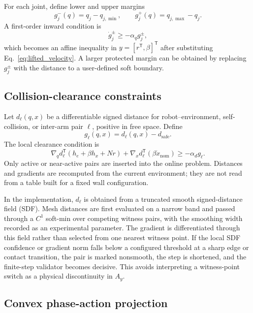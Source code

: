 \documentclass[preprint,12pt]{elsarticle}
\newcommand{\T}{^{\mathsf T}}
\begin{document}
For each joint, define lower and upper margins
\begin{equation}
g_j^-(q)=q_j-q_{j,\min},
\qquad
g_j^+(q)=q_{j,\max}-q_j.
\end{equation}
A first-order inward condition is
\begin{equation}
\dot g_j^{\pm}\geq-\alpha_q g_j^{\pm},
\label{eq:joint_damper}
\end{equation}
which becomes an affine inequality in $y=[r\T,\beta]\T$ after substituting Eq.~\eqref{eq:lifted_velocity}. A larger protected margin can be obtained by replacing $g_j^{\pm}$ with the distance to a user-defined soft boundary.

\subsection{Collision-clearance constraints}

Let $d_\ell(q,x)$ be a differentiable signed distance for robot--environment, self-collision, or inter-arm pair $\ell$, positive in free space. Define
\begin{equation}
g_\ell(q,x)=d_\ell(q,x)-d_{\mathrm{safe}}.
\end{equation}
The local clearance condition is
\begin{equation}
\nabla_q d_\ell\T(h_e+\beta h_x+Nr)
+
\nabla_x d_\ell\T(\beta\dot x_{\mathrm{nom}})
\geq
-\alpha_d g_\ell.
\label{eq:collision_damper}
\end{equation}
Only active or near-active pairs are inserted into the online problem. Distances and gradients are recomputed from the current environment; they are not read from a table built for a fixed wall configuration.

In the implementation, $d_\ell$ is obtained from a truncated smooth signed-distance field (SDF). Mesh distances are first evaluated on a narrow band and passed through a $C^1$ soft-min over competing witness pairs, with the smoothing width recorded as an experimental parameter. The gradient is differentiated through this field rather than selected from one nearest witness point. If the local SDF confidence or gradient norm falls below a configured threshold at a sharp edge or contact transition, the pair is marked nonsmooth, the step is shortened, and the finite-step validator becomes decisive. This avoids interpreting a witness-point switch as a physical discontinuity in $A_y$.

\subsection{Convex phase-action projection}
\end{document}
